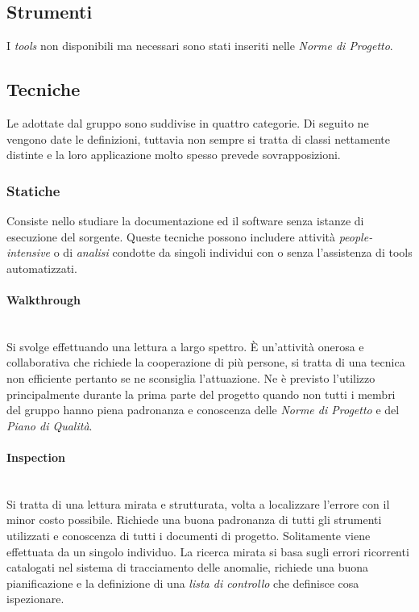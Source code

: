 	\subsection{Strumenti}
		I \emph{tools} non disponibili ma necessari sono stati inseriti nelle \emph{Norme di Progetto}. %
\fi

	\subsection{Tecniche}

	Le  adottate dal gruppo sono suddivise in quattro categorie. Di seguito ne vengono date le definizioni, tuttavia non sempre si tratta di classi nettamente distinte e la loro applicazione molto spesso prevede sovrapposizioni.
	
		\subsubsection{Statiche}

		Consiste nello studiare la documentazione ed il software senza istanze di esecuzione del sorgente. Queste tecniche possono includere attività \emph{people-intensive} o di \emph{analisi} condotte da singoli individui con o senza l'assistenza di tools automatizzati.

			\paragraph{Walkthrough} \mbox{} \\
			
			Si svolge effettuando una lettura a largo spettro. È un'attività onerosa e collaborativa che richiede la cooperazione di più persone, si tratta di una tecnica non efficiente pertanto se ne sconsiglia l'attuazione. Ne è previsto l'utilizzo principalmente durante la prima parte del progetto quando non tutti i membri del gruppo hanno piena padronanza e conoscenza delle \emph{Norme di Progetto} e del \emph{Piano di Qualità}.

			\paragraph{Inspection} \mbox{} \\

			Si tratta di una lettura mirata e strutturata, volta a localizzare l'errore con il minor costo possibile. Richiede una buona padronanza di tutti gli strumenti utilizzati e conoscenza di tutti i documenti di progetto. Solitamente viene effettuata da un singolo individuo. La ricerca mirata si basa sugli errori ricorrenti catalogati nel sistema di tracciamento delle anomalie, richiede una buona pianificazione e la definizione di una \emph{lista di controllo} che definisce cosa ispezionare.
			
